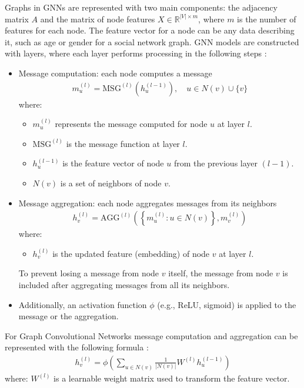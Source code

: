 Graphs in GNNs are represented with two main components: the adjacency matrix $A$ and the matrix of node features $X \in \mathbb{R}^{|V| \times m}$, where $m$ is the number of features for each node. The feature vector for a node can be any data describing it, such as age or gender for a social network graph. GNN models are constructed with layers, where each layer performs processing in the following steps \cite{Lesk2024}:
\begin{itemize}
    \item Message computation: each node computes a message 
        \begin{align}
            m_u^{(l)} = \text{MSG}^{(l)}(h_u^{(l-1)}), \quad u \in N(v) \cup \{v\}
        \end{align}
        where:
        \begin{itemize}
            \item $m_u^{(l)}$ represents the message computed for node $u$ at layer $l$.
            \item $\text{MSG}^{(l)}$ is the message function at layer $l$.
            \item $h_u^{(l-1)}$ is the feature vector of node $u$ from the previous layer $(l-1)$.
            \item $N(v)$ is a set of neighbors of node $v$.
        \end{itemize}
    \item Message aggregation: each node aggregates messages from its neighbors
        \begin{align}
            h_v^{(l)} = \text{AGG}^{(l)}\left(\left\{ m_u^{(l)} : u \in N(v) \right\}, m_v^{(l)}\right)
        \end{align}
        where:
        \begin{itemize}
            \item $h_v^{(l)}$ is the updated feature (embedding) of node $v$ at layer $l$. 
        \end{itemize}
        To prevent losing a message from node $v$ itself, the message from node $v$ is included after aggregating messages from all its neighbors.   
    \item Additionally, an activation function $\phi$ (e.g., ReLU, sigmoid) is applied to the message or the aggregation.
\end{itemize}

For Graph Convolutional Networks message computation and aggregation can be represented with the following formula \cite{Lesk2024}:
\begin{align}
    h_v^{(l)} = \phi \left( \sum_{u \in N(v)} \frac{1}{|N(v)|} W^{(l)} h_u^{(l-1)} \right)
\end{align}
where:
$W^{(l)}$ is a learnable weight matrix used to transform the feature vector.

